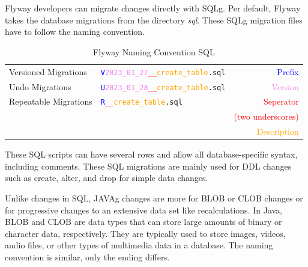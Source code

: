 %
Flyway developers can migrate changes directly with \gls{SQLg}. Per default, Flyway takes the database migrations from the directory \textit{sql}.
These \gls{SQLg} migration files have to follow the naming convention.

\begin{table}[H]
\begin{tabularx}{11cm}{l l r}
Versioned Migrations & \texttt{\textcolor{blue}{V}\textcolor{violet}{2023\_01\_27}\textcolor{red}{\_\_}\textcolor{orange}{create\_table}.sql} & \textcolor{blue}{Prefix}\\
Undo Migrations &  \texttt{\textcolor{blue}{U}\textcolor{violet}{2023\_01\_28}\textcolor{red}{\_\_}\textcolor{orange}{create\_table}.sql} & \textcolor{violet}{Version}\\
Repeatable Migrations & \texttt{\textcolor{blue}{R}\textcolor{red}{\_\_}\textcolor{orange}{create\_table}.sql} &  \textcolor{red}{Seperator} \\
& & \textcolor{red}{(two underscores)}\\
& & \textcolor{orange}{Description}\\


\end{tabularx}
\caption{Flyway Naming Convention SQL}
\label{tab:naming_convention_flyway_sql}
\end{table}

These \gls{SQL} scripts can have several rows and allow all database-specific syntax, including comments. These \gls{SQL} migrations are mainly used for DDL changes such as create, alter, and drop for simple data changes.

%
Unlike changes in \gls{SQL}, \gls{JAVAg} changes are more for \gls{BLOB} or \gls{CLOB} changes or for progressive changes to an extensive data set like recalculations. In Java, \gls{BLOB} and \gls{CLOB} are data types that can store large amounts of binary or character data, respectively. They are typically used to store images, videos, audio files, or other types of multimedia data in a database. The naming convention is similar, only the ending differs. 


